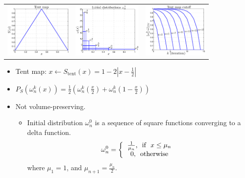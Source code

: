 \documentclass[12pt,t]{beamer}
\begin{document}
\begin{frame}
\begin{center}
\vspace{-0.4cm}
\begin{tabular}{rcl}
\includegraphics[height=2.7cm,trim=1.5cm 0.7cm 1cm 1cm]{tentmap}&
\includegraphics[height=2.7cm,trim=1.1cm 0.7cm 1cm 1cm]{tentmapomega0}&
\includegraphics[height=2.7cm,trim=1.1cm 0.7cm 1cm 1cm]{tentmapcutoff}
\end{tabular}
\vspace{-0.3cm}
\end{center}
\begin{itemize}
  \item Tent map: $x \leftarrow S_\text{tent}(x) = 1-2\left|x-\frac{1}{2}\right|$
  \item $P_S(\omega_n^k(x)) = \frac{1}{2}\left(\omega_n^k\left(\frac{x}{2}\right)+\omega_n^k\left(1-\frac{x}{2}\right) \right)$
  \item Not volume-preserving.  
     \begin{itemize}
      \item Initial distribution $\omega_n^0$ is a sequence of square functions converging to a delta function.
  \begin{eqnarray*}
  \label{tentmapinitial}
    \omega_n^0 = \left\{ \begin{tabular}{c}
                      $\frac{1}{\mu_n}$, \mbox{  if  } $x \le \mu_n$\\
                      $0$, \mbox{  otherwise}
                      \end{tabular}\right.
  \end{eqnarray*}
where $\mu_1 = 1$, and $\mu_{n+1} = \frac{\mu_n}{2}$.
     \end{itemize}
\end{itemize}
\end{frame}
\end{document}
